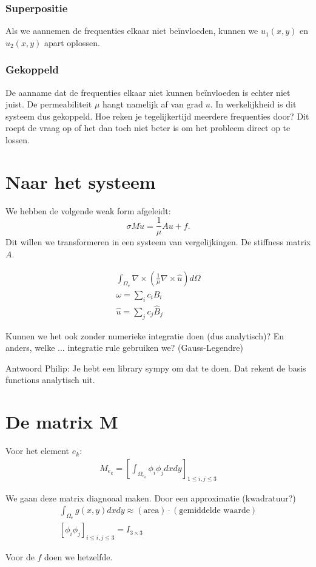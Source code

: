 \documentclass[11pt]{report}
\begin{document}
\subsubsection{Superpositie}
Als we aannemen de frequenties elkaar niet beïnvloeden, kunnen we $\hat u_1(x,y)$ en $\hat u_2(x,y)$ apart oplossen.

\subsubsection{Gekoppeld}
De aanname dat de frequenties elkaar niet kunnen beïnvloeden is echter niet juist. De permeabiliteit $\mu$ hangt namelijk af van $\text{grad} \; u$. In werkelijkheid is dit systeem dus gekoppeld. Hoe reken je tegelijkertijd meerdere frequenties door? Dit roept de vraag op of het dan toch niet beter is om het probleem direct op te lossen.

\section{Naar het systeem}

We hebben de volgende weak form afgeleidt:
\begin{equation}
    \sigma M \dot u = \frac{1}{\mu}A u + f.
\end{equation}
Dit willen we transformeren in een systeem van vergelijkingen. De stiffness matrix $A$.

\begin{align*}
    \int_{\Omega_e} \nabla \times \left(\frac{1}{\mu} \nabla \times \hat u\right) d \Omega \\
    \omega = \sum_i c_i B_i\\
    \hat u = \sum_j c_j \hat B_j
\end{align*}

Kunnen we het ook zonder numerieke integratie doen (dus analytisch)? En anders, welke ... integratie rule gebruiken we? (Gauss-Legendre)

Antwoord Philip: Je hebt een library sympy om dat te doen. Dat rekent de basis functions analytisch uit.

\section{De matrix M}

Voor het element $e_k$:
\begin{align*}
    M_{e_k} = \left[\int_{\Omega_{e_k}}\phi_i\phi_jdxdy\right]_{1 \leq i, j \leq 3}
\end{align*}

We gaan deze matrix diagnoaal maken. Door een approximatie (kwadratuur?)
\begin{align*}
    \int_{\Omega_e}g(x,y)dxdy \approx (\text{area}) \cdot (\text{gemiddelde waarde}) \\
    \left[\phi_i\phi_j\right]_{i \leq i,j \leq 3} = I_{3 \times 3}
\end{align*}

Voor de $f$ doen we hetzelfde.
\end{document}
